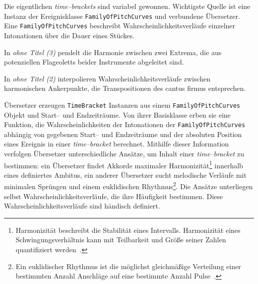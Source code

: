 \documentclass[12pt,a4paper,ngerman]{article}
\begin{document}
\bigskip

Die eigentlichen \emph{time--brackets} sind variabel gewonnen.
Wichtigste Quelle ist eine Instanz der Ereignisklasse \texttt{FamilyOfPitchCurves} und verbundene Übersetzer.
Eine \texttt{FamilyOfPitchCurves} beschreibt Wahrscheinlichkeitsverläufe einzelner Intonationen über die Dauer eines Stückes.

\smallskip

In \emph{ohne Titel (3)} pendelt die Harmonie zwischen zwei Extrema, die aus potenziellen Flageoletts beider Instrumente abgeleitet sind.

\smallskip

In \emph{ohne Titel (2)} interpolieren Wahrscheinlichkeitsverläufe zwischen harmonischen Ankerpunkte, die Transpositionen des cantus firmus entsprechen.

\smallskip

Übersetzer erzeugen \texttt{TimeBracket} Instanzen aus einem \texttt{FamilyOfPitchCurves} Objekt und Start-- und Endzeiträume.
Von ihrer Basisklasse erben sie eine Funktion, die Wahrscheinlichkeiten der Intonationen der \texttt{FamilyOfPitchCurves} abhängig von gegebenen Start-- und Endzeiträume und der absoluten Position eines Ereignis in einer \emph{time--bracket} berechnet.
Mithilfe dieser Information verfolgen Übersetzer unterschiedliche Ansätze, um Inhalt einer \emph{time--bracket} zu bestimmen:
ein Übersetzer findet Akkorde maximaler Harmonizität\footnote{%
    Harmonizität beschreibt die Stabilität eines Intervalls.
    Harmonizität eines Schwingungsverhältnis kann mit Teilbarkeit und Größe seiner Zahlen quantifiziert werden~\parencite[S. 5f]{barlowHarmonicity}.
} innerhalb eines definiertes Ambitus,
ein anderer Übersetzer sucht melodische Verläufe mit minimalen Sprüngen und einem euklidischen Rhythmus\footnote{%
    Ein euklidischer Rhythmus ist die möglichst gleichmäßige Verteilung einer bestimmten Anzahl Anschläge auf eine bestimmte Anzahl Pulse~\parencite{toussaintEuclidean}.
}.
Die Ansätze unterliegen selbst Wahrscheinlichkeitsverläufe, die ihre Häufigkeit bestimmen.
Diese Wahrscheinlichkeitsverläufe sind händisch definiert.
\end{document}

